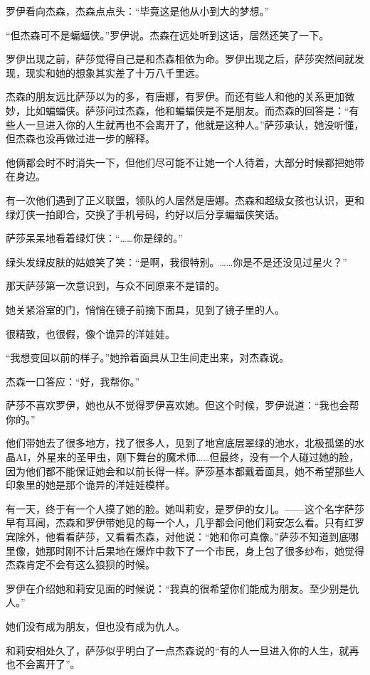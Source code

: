 \documentclass[../main]{subfiles}
\begin{document}
罗伊看向杰森，杰森点点头：“毕竟这是他从小到大的梦想。”

“但杰森可不是蝙蝠侠。”罗伊说。杰森在远处听到这话，居然还笑了一下。

罗伊出现之前，萨莎觉得自己是和杰森相依为命。罗伊出现之后，萨莎突然间就发现，现实和她的想象其实差了十万八千里远。

杰森的朋友远比萨莎以为的多，有唐娜，有罗伊。而还有些人和他的关系更加微妙，比如蝙蝠侠。萨莎问过杰森，他和蝙蝠侠是不是朋友。而杰森的回答是：“有些人一旦进入你的人生就再也不会离开了，他就是这种人。”萨莎承认，她没听懂，但杰森也没再做过进一步的解释。

他俩都会时不时消失一下，但他们尽可能不让她一个人待着，大部分时候都把她带在身边。

有一次他们遇到了正义联盟，领队的人居然是唐娜。杰森和超级女孩也认识，更和绿灯侠一拍即合，交换了手机号码，约好以后分享蝙蝠侠笑话。

萨莎呆呆地看着绿灯侠：“……你是绿的。”

绿头发绿皮肤的姑娘笑了笑：“是啊，我很特别。……你是不是还没见过星火？”

那天萨莎第一次意识到，与众不同原来不是错的。

她关紧浴室的门，悄悄在镜子前摘下面具，见到了镜子里的人。

很精致，也很假，像个诡异的洋娃娃。

“我想变回以前的样子。”她拎着面具从卫生间走出来，对杰森说。

杰森一口答应：“好，我帮你。”

萨莎不喜欢罗伊，她也从不觉得罗伊喜欢她。但这个时候，罗伊说道：“我也会帮你的。”

他们带她去了很多地方，找了很多人，见到了地宫底层翠绿的池水，北极孤堡的水晶AI，外星来的圣甲虫，刚下舞台的魔术师……但最终，没有一个人碰过她的脸，因为他们都不能保证她会和以前长得一样。萨莎基本都戴着面具，她不希望那些人印象里的她是那个诡异的洋娃娃模样。

有一天，终于有一个人摸了她的脸。她叫莉安，是罗伊的女儿。——这个名字萨莎早有耳闻，杰森和罗伊带她见的每一个人，几乎都会问他们莉安怎么看。只有红罗宾除外，他看看萨莎，又看看杰森，对他说：“她和你可真像。”萨莎不知道到底哪里像，她那时刚不计后果地在爆炸中救下了一个市民，身上包了很多纱布，她觉得杰森肯定不会有这么狼狈的时候。

罗伊在介绍她和莉安见面的时候说：“我真的很希望你们能成为朋友。至少别是仇人。”

她们没有成为朋友，但也没有成为仇人。

和莉安相处久了，萨莎似乎明白了一点杰森说的“有的人一旦进入你的人生，就再也不会离开了”。
\end{document}
